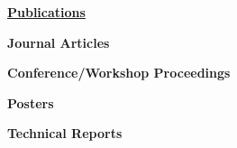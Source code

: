\documentclass[letterpaper,11pt]{article}
\newcommand{\resheading}[1]{{\large \colorbox{mygrey}{\begin{minipage}{\textwidth}{\textbf{#1 \vphantom{p\^{E}}}}\end{minipage}}}}
\begin{document}
\resheading{\href{http://scholar.google.com/citations?user=6l5Wb4QAAAAJ&hl=en\%22}{Publications}}
\begingroup
\renewcommand{\section}[2]{}
%
\begin{description}
\item\textbf{Journal Articles}
%
%
\item\textbf{Conference/Workshop Proceedings}
%
%
\item\textbf{Posters}
%
%
\item\textbf{Technical Reports}
%
%
\end{description}
%
\endgroup
\end{document}
